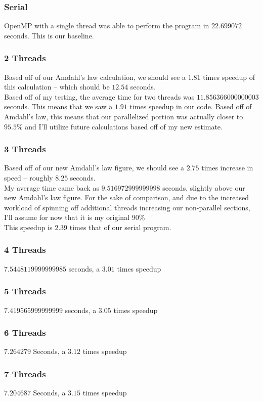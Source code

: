\documentclass{article}
\begin{document}
\subsubsection*{Serial}
OpenMP with a single thread was able to perform the program in $22.699072$ seconds. This is our baseline.
\subsubsection*{2 Threads}
Based off of our Amdahl's law calculation, we should see a $1.81$ times speedup of this calculation -- which should be $12.54$ seconds.\\
Based off of my testing, the average time for two threads was $11.856366000000003$ seconds. This means that we saw a $1.91$ times speedup in our code. Based off of Amdahl's law, this means that our parallelized portion was actually closer to $95.5\%$ and I'll utilize future calculations based off of my new estimate.
\subsubsection*{3 Threads}
Based off of our new Amdahl's law figure, we should see a $2.75$ times increase in speed -- roughly $8.25$ seconds.\\
My average time came back as $9.516972999999998$ seconds, slightly above our new Amdahl's law figure. For the sake of comparison, and due to the increased workload of spinning off additional threads increasing our non-parallel sections, I'll assume for now that it is my original 90\%\\
This speedup is $2.39$ times that of our serial program.
\subsubsection*{4 Threads}
$7.5448119999999985$ seconds, a $3.01$ times speedup
\subsubsection*{5 Threads}
$7.419565999999999$ seconds, a $3.05$ times speedup
\subsubsection*{6 Threads}
$7.264279$ Seconds, a $3.12$ times speedup
\subsubsection*{7 Threads}
$7.204687$ Seconds, a $3.15$ times speedup
\end{document}
